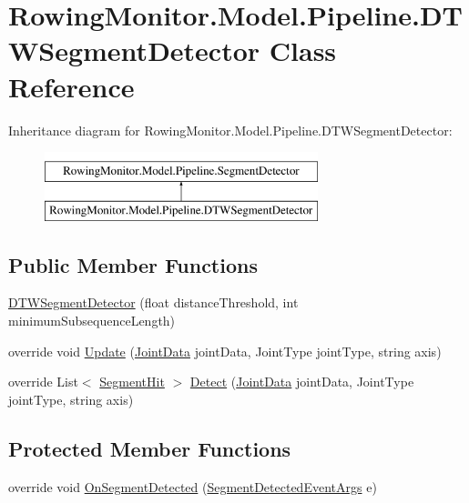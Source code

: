 \hypertarget{class_rowing_monitor_1_1_model_1_1_pipeline_1_1_d_t_w_segment_detector}{}\section{Rowing\+Monitor.\+Model.\+Pipeline.\+D\+T\+W\+Segment\+Detector Class Reference}
\label{class_rowing_monitor_1_1_model_1_1_pipeline_1_1_d_t_w_segment_detector}
Inheritance diagram for Rowing\+Monitor.\+Model.\+Pipeline.\+D\+T\+W\+Segment\+Detector\+:\begin{figure}[H]
\begin{center}
\leavevmode
\includegraphics[height=2.000000cm]{class_rowing_monitor_1_1_model_1_1_pipeline_1_1_d_t_w_segment_detector}
\end{center}
\end{figure}
\subsection*{Public Member Functions}
\begin{DoxyCompactItemize}
\item 
\hyperlink{class_rowing_monitor_1_1_model_1_1_pipeline_1_1_d_t_w_segment_detector_abfb0a6199eaaf5bb079bbcf1c2eaecc5}{D\+T\+W\+Segment\+Detector} (float distance\+Threshold, int minimum\+Subsequence\+Length)
\item 
override void \hyperlink{class_rowing_monitor_1_1_model_1_1_pipeline_1_1_d_t_w_segment_detector_a211aec92693f8a229d88dd6a5b059eb4}{Update} (\hyperlink{struct_rowing_monitor_1_1_model_1_1_util_1_1_joint_data}{Joint\+Data} joint\+Data, Joint\+Type joint\+Type, string axis)
\item 
override List$<$ \hyperlink{struct_rowing_monitor_1_1_model_1_1_util_1_1_segment_hit}{Segment\+Hit} $>$ \hyperlink{class_rowing_monitor_1_1_model_1_1_pipeline_1_1_d_t_w_segment_detector_ab65c258b405b4a73e22ea114173965a6}{Detect} (\hyperlink{struct_rowing_monitor_1_1_model_1_1_util_1_1_joint_data}{Joint\+Data} joint\+Data, Joint\+Type joint\+Type, string axis)
\end{DoxyCompactItemize}
\subsection*{Protected Member Functions}
\begin{DoxyCompactItemize}
\item 
override void \hyperlink{class_rowing_monitor_1_1_model_1_1_pipeline_1_1_d_t_w_segment_detector_a6d2644f751e290cef82649c42becdd92}{On\+Segment\+Detected} (\hyperlink{class_rowing_monitor_1_1_model_1_1_segment_detected_event_args}{Segment\+Detected\+Event\+Args} e)
\end{DoxyCompactItemize}
